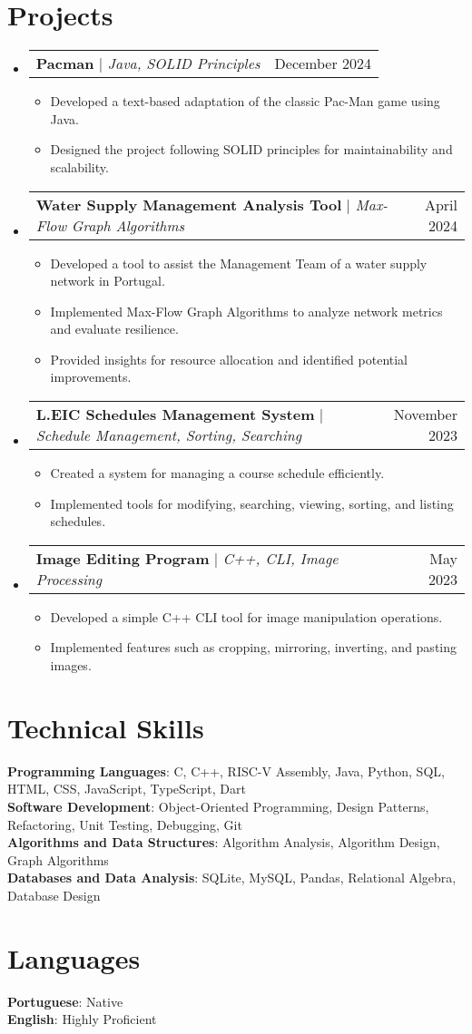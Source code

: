 \documentclass[a4paper,11pt]{article}
\makeatletter
\newcommand{\resumeItem}[1]{
	\item\small{
		{#1 \vspace{-2pt}}
	}
}
\newcommand{\resumeProjectHeading}[2]{
	\item
	\begin{tabular*}{0.97\textwidth}{l@{\extracolsep{\fill}}r}
		\small#1 & #2 \\
	\end{tabular*}\vspace{-7pt}
}
\newcommand{\resumeSubHeadingListStart}{\begin{itemize}[leftmargin=0.15in, label={}]}
\newcommand{\resumeSubHeadingListEnd}{\end{itemize}}
\newcommand{\resumeItemListStart}{\begin{itemize}}
\newcommand{\resumeItemListEnd}{\end{itemize}\vspace{-5pt}}
\makeatother
\begin{document}
\section{Projects}
\resumeSubHeadingListStart%

\resumeProjectHeading%
{\textbf{Pacman} $|$ \emph{Java, SOLID Principles}}{December 2024}
\resumeItemListStart%
\resumeItem{Developed a text-based adaptation of the classic Pac-Man game using Java.}
\resumeItem{Designed the project following SOLID principles for maintainability and scalability.}
\resumeItemListEnd%

\resumeProjectHeading%
{\textbf{Water Supply Management Analysis Tool} $|$ \emph{Max-Flow Graph Algorithms}}{April 2024}
\resumeItemListStart%
\resumeItem{Developed a tool to assist the Management Team of a water supply network in Portugal.}
\resumeItem{Implemented Max-Flow Graph Algorithms to analyze network metrics and evaluate resilience.}
\resumeItem{Provided insights for resource allocation and identified potential improvements.}
\resumeItemListEnd%

\resumeProjectHeading%
{\textbf{L.EIC Schedules Management System} $|$ \emph{Schedule Management, Sorting, Searching}}{November 2023}
\resumeItemListStart%
\resumeItem{Created a system for managing a course schedule efficiently.}
\resumeItem{Implemented tools for modifying, searching, viewing, sorting, and listing schedules.}
\resumeItemListEnd%

\resumeProjectHeading%
{\textbf{Image Editing Program} $|$ \emph{C++, CLI, Image Processing}}{May 2023}
\resumeItemListStart%
\resumeItem{Developed a simple C++ CLI tool for image manipulation operations.}
\resumeItem{Implemented features such as cropping, mirroring, inverting, and pasting images.}
\resumeItemListEnd%

\resumeSubHeadingListEnd%

\section{Technical Skills}
\begin{itemize}[leftmargin=0.15in, label={}]
	\small{\item{
	      \textbf{Programming Languages}{: C, C++, RISC-V Assembly, Java, Python, SQL, HTML, CSS, JavaScript, TypeScript, Dart} \\
	      \textbf{Software Development}{: Object-Oriented Programming, Design Patterns, Refactoring, Unit Testing, Debugging, Git} \\
	      \textbf{Algorithms and Data Structures}{: Algorithm Analysis, Algorithm Design, Graph Algorithms} \\
	      \textbf{Databases and Data Analysis}{: SQLite, MySQL, Pandas, Relational Algebra, Database Design}
	      }}
\end{itemize}

\section{Languages}
\begin{itemize}[leftmargin=0.15in, label={}]
	\small{\item{
	      \textbf{Portuguese}{: Native} \\
	      \textbf{English}{: Highly Proficient}
	      }}
\end{itemize}

\end{document}

